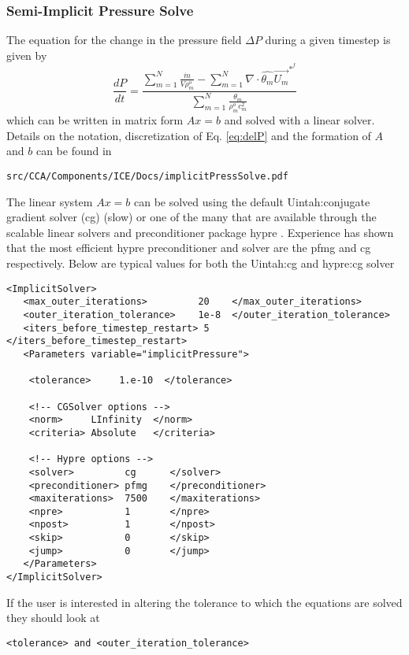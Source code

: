 \subsubsection{Semi-Implicit Pressure Solve}
The equation for the change in the pressure field $\Delta{P}$ during a given
timestep is given by
%
\begin{equation}
    \label{eq:delP}
     \frac{dP}{dt} = 
     \frac{\sum \limits_{{m}=1}^N  \frac{\dot{m}} {V \rho^{o}_m} 
        -  \sum \limits_{{m}=1}^N \nabla \cdot \widehat{\theta_m} \vec{U_m}^{*^{f}}}
          {\sum \limits_{{m}=1}^N \frac{\theta_m}{\rho^{o}_m c_m^2} }
\end{equation}
%
which can be written in matrix form $Ax = b$ and solved with a linear solver.  Details on the
notation, discretization of Eq. \ref{eq:delP} and the formation of $A$
and $b$ can be found in
%
\begin{Verbatim}[fontsize=\footnotesize]
 src/CCA/Components/ICE/Docs/implicitPressSolve.pdf
\end{Verbatim}
%
The linear system $Ax = b$ can be solved using the default Uintah:conjugate
gradient solver (cg) (slow) or one of the many that are available
through the scalable linear solvers and preconditioner package hypre
\cite{ref:hypre}. Experience has shown that the most efficient hypre
preconditioner and solver are the pfmg and cg respectively.  Below are
typical values for both the Uintah:cg and hypre:cg solver
%
\begin{Verbatim}[fontsize=\footnotesize]
<ImplicitSolver>
   <max_outer_iterations>         20    </max_outer_iterations>
   <outer_iteration_tolerance>    1e-8  </outer_iteration_tolerance>
   <iters_before_timestep_restart> 5    </iters_before_timestep_restart>
   <Parameters variable="implicitPressure">

    <tolerance>     1.e-10  </tolerance>
    
    <!-- CGSolver options -->
    <norm>     LInfinity  </norm>
    <criteria> Absolute   </criteria>

    <!-- Hypre options -->
    <solver>         cg      </solver>
    <preconditioner> pfmg    </preconditioner>
    <maxiterations>  7500    </maxiterations>
    <npre>           1       </npre>
    <npost>          1       </npost>
    <skip>           0       </skip>
    <jump>           0       </jump>
   </Parameters>
</ImplicitSolver>
\end{Verbatim}
%
If the user is interested in altering the tolerance to which the equations are solved they should look at
\begin{Verbatim}[fontsize=\footnotesize]
<tolerance> and <outer_iteration_tolerance>
\end{Verbatim} 
